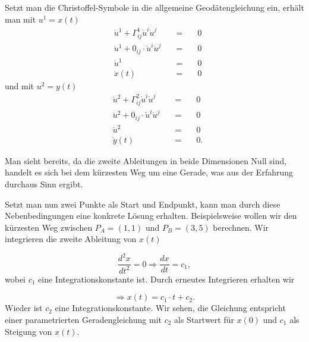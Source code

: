 Setzt man die Christoffel-Symbole in die allgemeine Geodätengleichung ein, erhält man mit $u^1 = x(t)$
\begin{equation}
	\begin{alignedat}{2}
		&\ddot{u}^1 + \Gamma_{ij}^1 \dot{u}^i \dot{u}^j &=& \quad 0 \\
		&\ddot{u}^1 + 0_{ij} \cdot \dot{u}^i \dot{u}^j \quad &=& \quad 0\\
		&\ddot{u}^1  &=& \quad 0 \\
		&\ddot{x}(t) &=& \quad 0
	\end{alignedat}
	\label{geodaeten:equation:Standardverfahren:Kartesisch:x}
\end{equation}
und mit $u^2 = y(t)$
\begin{equation}
	\begin{alignedat}{2}
		&\ddot{u}^2 + \Gamma_{ij}^2 \dot{u}^i \dot{u}^j &=& \quad 0 \\
		&\ddot{u}^2 + 0_{ij} \cdot \dot{u}^i \dot{u}^j \quad &=& \quad 0 \\
		&\ddot{u}^2  &=& \quad 0 \\
		&\ddot{y}(t) &=& \quad 0  .
	\end{alignedat}
	\label{geodaeten:equation:Standardverfahren:Kartesisch:y}
\end{equation}


Man sieht bereits, da die zweite Ableitungen in beide Dimensionen Null sind, handelt es sich bei dem kürzesten Weg um eine Gerade, was aus der Erfahrung durchaus Sinn ergibt.

Setzt man nun zwei Punkte als Start und Endpunkt, kann man durch diese Nebenbedingungen eine konkrete Lösung erhalten.
Beispielsweise wollen wir den kürzesten Weg zwischen $P_A = (1,1)$ und $P_B = (3,5)$ berechnen. Wir integrieren die zweite Ableitung von $x(t)$

\begin{equation}
	\frac{d^2x}{dt^2} = 0 \Rightarrow \frac{dx}{dt} = c_1 ,
\end{equation}
wobei $c_1$ eine Integrationskonstante ist. Durch erneutes Integrieren erhalten wir

\begin{equation}
\Rightarrow x(t) = c_1 \cdot t + c_2  .
\label{geodaeten:equation:Standardverfahren:Kartesisch:equation1}
\end{equation}
Wieder ist $c_2$ eine Integrationskonstante. 
Wir sehen, die Gleichung entspricht einer parametrierten Geradengleichung mit $c_2$ als Startwert für $x(0)$ und $c_1$ als Steigung von $x(t)$. 


